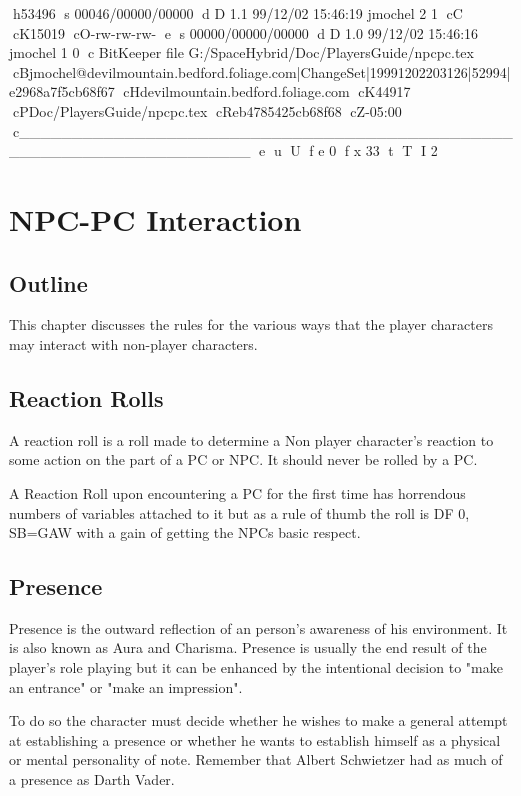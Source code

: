 h53496
s 00046/00000/00000
d D 1.1 99/12/02 15:46:19 jmochel 2 1
cC
cK15019
cO-rw-rw-rw-
e
s 00000/00000/00000
d D 1.0 99/12/02 15:46:16 jmochel 1 0
c BitKeeper file G:/SpaceHybrid/Doc/PlayersGuide/npcpc.tex
cBjmochel@devilmountain.bedford.foliage.com|ChangeSet|19991202203126|52994|e2968a7f5cb68f67
cHdevilmountain.bedford.foliage.com
cK44917
cPDoc/PlayersGuide/npcpc.tex
cReb4785425cb68f68
cZ-05:00
c______________________________________________________________________
e
u
U
f e 0
f x 33
t
T
I 2
\chapter{NPC-PC Interaction}

\section{Outline}

This chapter discusses the rules for the various ways that the player 
characters may interact with 
non-player characters.

\section{Reaction Rolls}

A reaction roll is a roll made to determine a Non player character's 
reaction to some action on the part of a PC or NPC. It should never 
be rolled by a PC.

A Reaction Roll upon encountering a PC for the first time has 
horrendous numbers of variables attached to it but as a rule of thumb 
the roll is DF 0, SB=GAW with a gain of getting the NPCs basic respect.

\section{Presence}

Presence is the outward reflection of an person's awareness of his 
environment. It is also known as Aura and Charisma. Presence is 
usually the end result of the player's role playing but it can be 
enhanced by the intentional decision to "make an entrance" or "make an 
impression".

To do so the character must decide whether he wishes to make a
general attempt at establishing a presence or whether he wants to 
establish himself as a physical or mental personality of note.
Remember that Albert Schwietzer had as much of a presence as Darth
Vader.

